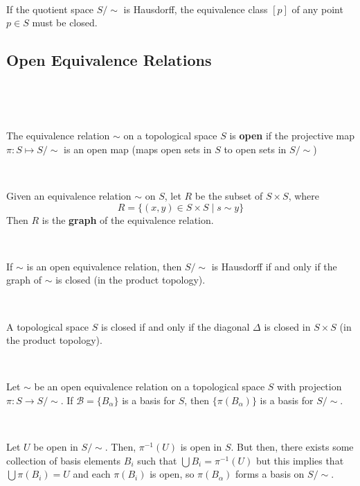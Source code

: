 \documentclass{article}
\begin{document}
\begin{proposition}
  \

  If the quotient space $S/\sim$ is Hausdorff, the equivalence class $[p]$ of any point $p \in S$ must be closed.
\end{proposition}

\subsection{Open Equivalence Relations}
\

\begin{definition}
  \

  The equivalence relation $\sim$ on a topological space $S$ is \textbf{open} if the projective map $\pi: S \mapsto S/\sim$ is an open map (maps open sets in $S$ to open sets in $S/\sim$)
\end{definition}

\begin{definition}
  \

  Given an equivalence relation $\sim$ on $S$, let $R$ be the subset of $S \times S$, where $$R = \{(x,y) \in S \times S \mid s \sim y\}$$Then $R$ is the \textbf{graph} of the equivalence relation.
\end{definition}

\begin{theorem}
  \

  If $\sim$ is an open equivalence relation, then $S/\sim$ is Hausdorff if and only if the graph of $\sim$ is closed (in the product topology).
\end{theorem}

\begin{corollary}
  \

  A topological space $S$ is closed if and only if the diagonal $\Delta$ is closed in $S \times S$ (in the product topology).
\end{corollary}

\begin{theorem}
  \

  Let $\sim$ be an open equivalence relation on a topological space $S$ with projection $\pi: S \to S/\sim$. If $\mathcal{B} = \{B_\alpha\}$ is a basis for $S$, then $\{\pi(B_\alpha)\}$ is a basis for $S/\sim$.
\end{theorem}

\begin{customproof}
  \

  Let $U$ be open in $S/\sim$. Then, $\pi ^{-1}(U)$ is open in $S$. But then, there exists some collection of basis elements $B_i$ such that $\bigcup B_i = \pi ^{-1}(U)$ but this implies that $\bigcup \pi(B_i) = U$ and each $\pi(B_i)$ is open, so $\pi(B_\alpha)$ forms a basis on $S/\sim$.
\end{customproof}
\end{document}
